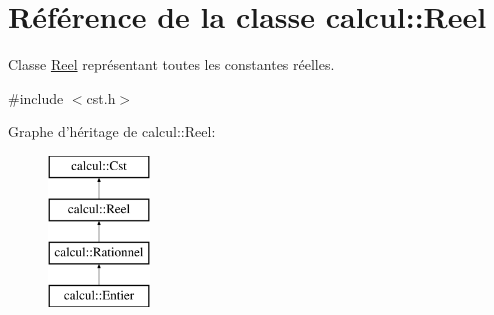 \hypertarget{classcalcul_1_1_reel}{\section{Référence de la classe calcul\-:\-:Reel}
\label{classcalcul_1_1_reel}
}


Classe \hyperlink{classcalcul_1_1_reel}{Reel} représentant toutes les constantes réelles.  




{\ttfamily \#include $<$cst.\-h$>$}

Graphe d'héritage de calcul\-:\-:Reel\-:\begin{figure}[H]
\begin{center}
\leavevmode
\includegraphics[height=4.000000cm]{classcalcul_1_1_reel}
\end{center}
\end{figure}
